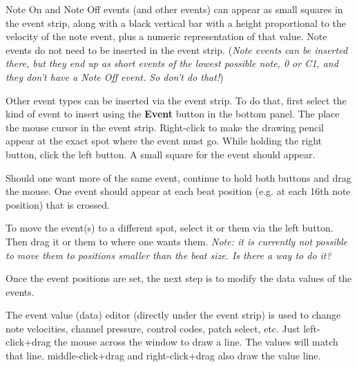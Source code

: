 
   Note On and Note Off events (and other events) can appear as small
   squares in the event strip, along with a black vertical bar with a height
   proportional to the
   velocity of the note event, plus a numeric representation of that value.
   Note events do not need to be inserted in the event strip.
   (\textsl{Note events can be inserted there, but they end up as short
   events of the lowest possible note, 0 or C1, and they don't have a Note
   Off event.  So don't do that!})

   Other event types can be inserted via the event strip.  To do that, first
   select the kind of event to insert using the \textbf{Event} button in the
   bottom panel.  The place the mouse cursor in the event strip.
   Right-click to make the drawing pencil appear at the exact spot where the
   event must go.  While holding the right button, click the left button.
   A small square for the event should appear.

   Should one want more of the same event, continue to hold both buttons and
   drag the mouse.  One event should appear at each beat position (e.g. at
   each 16th note position) that is crossed.

   To move the event(s) to a different spot, select it or them via the left
   button.  Then drag it or them to where one wants them.
   \textsl{Note: it
   is currently not possible to move them to positions smaller than the
   beat size.  Is there a way to do it?}

   Once the event positions are set, the next step is to modify the
   data values of the events.

	The event value (data) editor (directly under the event strip) is used 
	to change note velocities, channel pressure, control codes,
	patch select, etc.
   Just left-click+drag the mouse across the window to draw a line.  The
   values will match that line.  
   middle-click+drag and right-click+drag also
   draw the value line.

